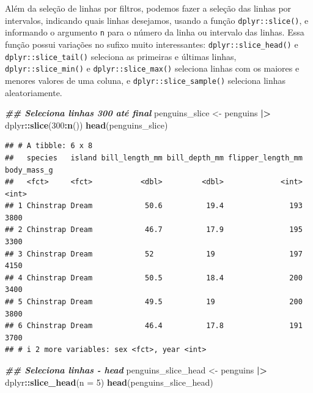 \documentclass[
]{article}
\newenvironment{Shaded}{\begin{snugshade}}{\end{snugshade}}
\newcommand{\AttributeTok}[1]{\textcolor[rgb]{0.13,0.29,0.53}{#1}}
\newcommand{\DecValTok}[1]{\textcolor[rgb]{0.00,0.00,0.81}{#1}}
\newcommand{\DocumentationTok}[1]{\textcolor[rgb]{0.56,0.35,0.01}{\textbf{\textit{#1}}}}
\newcommand{\FunctionTok}[1]{\textcolor[rgb]{0.13,0.29,0.53}{\textbf{#1}}}
\newcommand{\NormalTok}[1]{#1}
\newcommand{\OtherTok}[1]{\textcolor[rgb]{0.56,0.35,0.01}{#1}}
\newcommand{\SpecialCharTok}[1]{\textcolor[rgb]{0.81,0.36,0.00}{\textbf{#1}}}
\begin{document}
Além da seleção de linhas por filtros, podemos fazer a seleção das linhas por intervalos, indicando quais linhas desejamos, usando a função \texttt{dplyr::slice()}, e informando o argumento \texttt{n} para o número da linha ou intervalo das linhas. Essa função possui variações no sufixo muito interessantes: \texttt{dplyr::slice\_head()} e \texttt{dplyr::slice\_tail()} seleciona as primeiras e últimas linhas, \texttt{dplyr::slice\_min()} e \texttt{dplyr::slice\_max()} seleciona linhas com os maiores e menores valores de uma coluna, e \texttt{dplyr::slice\_sample()} seleciona linhas aleatoriamente.

\begin{Shaded}
\begin{Highlighting}[]
\DocumentationTok{\#\# Seleciona linhas 300 até final}
\NormalTok{penguins\_slice }\OtherTok{\textless{}{-}}\NormalTok{ penguins }\SpecialCharTok{|\textgreater{}} 
\NormalTok{    dplyr}\SpecialCharTok{::}\FunctionTok{slice}\NormalTok{(}\DecValTok{300}\SpecialCharTok{:}\FunctionTok{n}\NormalTok{())}
\FunctionTok{head}\NormalTok{(penguins\_slice)}
\end{Highlighting}
\end{Shaded}

\begin{verbatim}
## # A tibble: 6 x 8
##   species   island bill_length_mm bill_depth_mm flipper_length_mm body_mass_g
##   <fct>     <fct>           <dbl>         <dbl>             <int>       <int>
## 1 Chinstrap Dream            50.6          19.4               193        3800
## 2 Chinstrap Dream            46.7          17.9               195        3300
## 3 Chinstrap Dream            52            19                 197        4150
## 4 Chinstrap Dream            50.5          18.4               200        3400
## 5 Chinstrap Dream            49.5          19                 200        3800
## 6 Chinstrap Dream            46.4          17.8               191        3700
## # i 2 more variables: sex <fct>, year <int>
\end{verbatim}

\begin{Shaded}
\begin{Highlighting}[]
\DocumentationTok{\#\# Seleciona linhas {-} head}
\NormalTok{penguins\_slice\_head }\OtherTok{\textless{}{-}}\NormalTok{ penguins }\SpecialCharTok{|\textgreater{}} 
\NormalTok{    dplyr}\SpecialCharTok{::}\FunctionTok{slice\_head}\NormalTok{(}\AttributeTok{n =} \DecValTok{5}\NormalTok{)}
\FunctionTok{head}\NormalTok{(penguins\_slice\_head)}
\end{Highlighting}
\end{Shaded}
\end{document}
